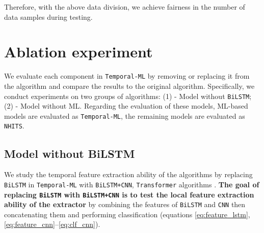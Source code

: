 Therefore, with the above data division, we achieve fairness in the number of data samples during testing.

\section{Ablation experiment}
\label{sec:ab_ex}



We evaluate each component in \verb|Temporal-ML| by removing or replacing it from the algorithm and compare the results to the original algorithm. Specifically, we conduct experiments on two groups of algorithms: (1) - Model without \verb|BiLSTM|; (2) - Model without ML. Regarding the evaluation of these models, ML-based models are evaluated as \verb|Temporal-ML|, the remaining models are evaluated as \verb|NHITS|.

\subsection{Model without BiLSTM}
\label{subsec:ablation_lstm}


We study the temporal feature extraction ability of the algorithms by replacing \verb|BiLSTM| in \verb|Temporal-ML| with \verb|BiLSTM+CNN|, \verb|Transformer| algorithms \cite{vaswani2017attention}. \textbf{The goal of replacing \Verb|BiLSTM| with \Verb|BiLSTM+CNN| is to test the local feature extraction ability of the extractor} by combining the features of \verb|BiLSTM| and \verb|CNN| then concatenating them and performing classification (equations \ref{eq:feature_lstm}, \ref{eq:feature_cnn}–\ref{eq:clf_cnn}).

